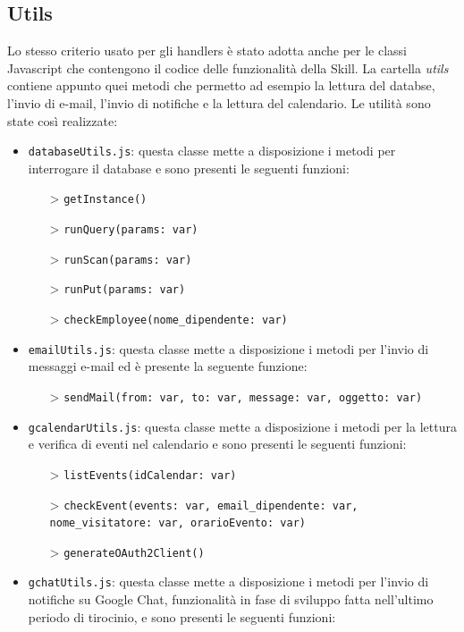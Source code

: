 \subsection{Utils}
Lo stesso criterio usato per gli handlers è stato adotta anche per le classi Javascript che contengono il codice delle funzionalità della Skill. La cartella \textit{utils} contiene appunto quei metodi che permetto ad esempio la lettura del databse, l'invio di e-mail, l'invio di notifiche e la lettura del calendario. Le utilità sono state così realizzate:
\begin{itemize}
    \item \texttt{databaseUtils.js}: questa classe mette a disposizione i metodi per interrogare il database e sono presenti le seguenti funzioni:
    \begin{itemize}
        \item[>] \texttt{getInstance()}
        \item[>] \texttt{runQuery(params: var)}
        \item[>] \texttt{runScan(params: var)}
        \item[>] \texttt{runPut(params: var)}
        \item[>] \texttt{checkEmployee(nome\_dipendente: var)}
    \end{itemize}
    \item \texttt{emailUtils.js}: questa classe mette a disposizione i metodi per l'invio di messaggi e-mail ed è presente la seguente funzione:
    \begin{itemize}
        \item[>] \texttt{sendMail(from: var, to: var, message: var, oggetto: var)}
    \end{itemize}
    \item \texttt{gcalendarUtils.js}: questa classe mette a disposizione i metodi per la lettura e verifica di eventi nel calendario e sono presenti le seguenti funzioni:
    \begin{itemize}
        \item[>] \texttt{listEvents(idCalendar: var)}
        \item[>] \texttt{checkEvent(events: var, email\_dipendente: var, nome\_visitatore: var, orarioEvento: var)}
        \item[>] \texttt{generateOAuth2Client()}
    \end{itemize}
    \item \texttt{gchatUtils.js}: questa classe mette a disposizione i metodi per l'invio di notifiche su Google Chat, funzionalità in fase di sviluppo fatta nell'ultimo periodo di tirocinio, e sono presenti le seguenti funzioni:

\end{itemize}
